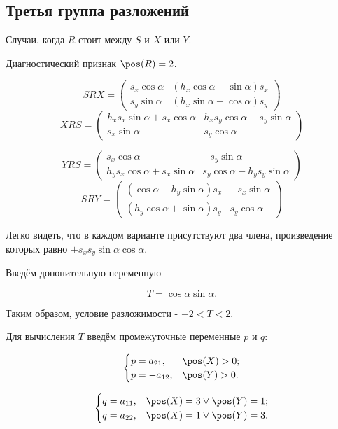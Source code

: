 \subsection{Третья группа разложений}

Случаи, когда $R$ стоит между $S$ и $X$ или $Y$.

Диагностический признак $\pos(R)=2$.

$$SRX = 
\begin{pmatrix}
	{s_x}\cos\alpha  & \left({h_x} \cos\alpha -\sin\alpha\right)  {s_x}\\
	{s_y}\sin\alpha  & \left({h_x} \sin\alpha +\cos\alpha\right)  {s_y}
\end{pmatrix}
$$
$$XRS = \begin{pmatrix}
	{h_x} {s_x} \sin\alpha + {s_x} \cos\alpha & {h_x} {s_y} \cos\alpha-{s_y} \sin\alpha\\
	{s_x} \sin\alpha & {s_y} \cos\alpha
\end{pmatrix}$$

$$YRS = \begin{pmatrix}
{s_x} \cos\alpha & -{s_y} \sin\alpha\\
{h_y} {s_x} \cos\alpha+{s_x} \sin\alpha & {s_y} \cos\alpha-{h_y} {s_y} \sin\alpha
\end{pmatrix}$$
$$SRY =
\begin{pmatrix}
\left( \cos\alpha-{h_y} \sin\alpha\right)  {s_x} & -{s_x} \sin\alpha\\
\left( {h_y} \cos\alpha+\sin\alpha\right)  {s_y} & {s_y} \cos\alpha
\end{pmatrix}
$$

Легко видеть, что в каждом варианте присутствуют два члена, произведение которых равно $\pm s_x s_y \sin\alpha \cos\alpha$.

Введём допонительную переменную

$$T = \cos\alpha\sin\alpha.$$

Таким образом, условие разложимости - $-2<T<2$. 

Для вычисления $T$ введём промежуточные переменные $p$ и $q$:

$$\begin{cases}
	p = a_{21}, & \pos(X)>0;\\
	p = -a_{12}, & \pos(Y)>0.
\end{cases}$$

$$\begin{cases}
	q = a_{11}, & \pos(X)=3 \vee \pos(Y)=1;\\
	q = a_{22}, & \pos(X)=1 \vee \pos(Y)=3.
\end{cases}$$

